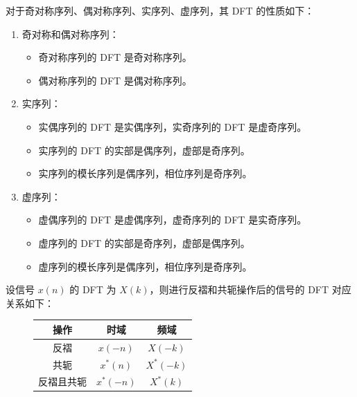\begin{property}
    对于奇对称序列、偶对称序列、实序列、虚序列，其 DFT 的性质如下：
    \begin{enumerate}
        \item 奇对称和偶对称序列：
            \begin{itemize}
                \item 奇对称序列的 DFT 是奇对称序列。
                \item 偶对称序列的 DFT 是偶对称序列。
            \end{itemize}
        \item 实序列：
            \begin{itemize}
                \item 实偶序列的 DFT 是实偶序列，实奇序列的 DFT 是虚奇序列。
                \item 实序列的 DFT 的实部是偶序列，虚部是奇序列。
                \item 实序列的模长序列是偶序列，相位序列是奇序列。
            \end{itemize}
        \item 虚序列：
            \begin{itemize}
                \item 虚偶序列的 DFT 是虚偶序列，虚奇序列的 DFT 是实奇序列。
                \item 虚序列的 DFT 的实部是奇序列，虚部是偶序列。
                \item 虚序列的模长序列是偶序列，相位序列是奇序列。
            \end{itemize}
    \end{enumerate}
\end{property}

\begin{property}
    设信号 $x(n)$ 的 DFT 为 $X(k)$，则进行反褶和共轭操作后的信号的 DFT 对应关系如下：
    \begin{figure}[H]
        \begin{tabular}
            {c||c|c}
            操作 & 时域 & 频域 \\
            \hline
            反褶 & $x(-n)$ & $X(-k)$ \\
            共轭 & $x^*(n)$ & $X^*(-k)$ \\
            反褶且共轭 & $x^*(-n)$ & $X^*(k)$ \\
        \end{tabular}
    \end{figure}
\end{property}

